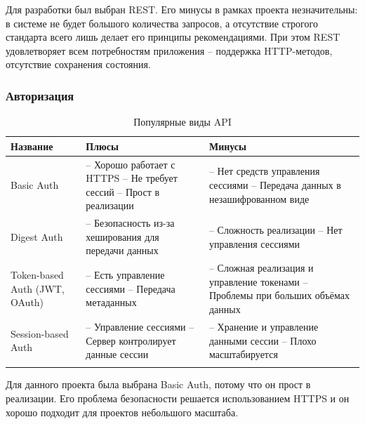 \documentclass[a4paper,article]{article}
\begin{document}
    Для разработки был выбран REST. Его минусы в рамках проекта незначительны: в системе не будет большого количества запросов, а отсутствие строгого стандарта всего лишь делает его принципы рекомендациями. При этом REST удовлетворяет всем потребностям приложения -- поддержка HTTP-методов, отсутствие сохранения состояния.

    \subsubsection{Авторизация}

    \begin{xltabular}{\textwidth} { |
            >{\hsize} X |
            >{\hsize} X |
            >{\hsize} X | }
        \hline
        Название & Плюсы & Минусы \\
        \hline
        Basic Auth
        & -- Хорошо работает с HTTPS \newline -- Не требует сессий \newline -- Прост в реализации
        & -- Нет средств управления сессиями \newline -- Передача данных в незашифрованном виде \\
        \hline
        Digest Auth
        & -- Безопасность из-за хеширования для передачи данных
        & -- Сложность реализации \newline -- Нет управления сессиями \\
        \hline
        Token-based Auth \newline (JWT, OAuth)
        & -- Есть управление сессиями \newline -- Передача метаданных
        & -- Сложная реализация и управление токенами \newline -- Проблемы при больших объёмах данных \\
        \hline
        Session-based Auth
        & -- Управление сессиями \newline -- Сервер контролирует данные сессии
        & -- Хранение и управление данными сессии \newline -- Плохо масштабируется \\
        \hline

        \caption{\centering Популярные виды API}

        \label{tab:Авторизация}
    \end{xltabular}

    Для данного проекта была выбрана Basic Auth, потому что он прост в реализации. Его проблема безопасности решается использованием HTTPS и он хорошо подходит для проектов небольшого масштаба.
\end{document}
